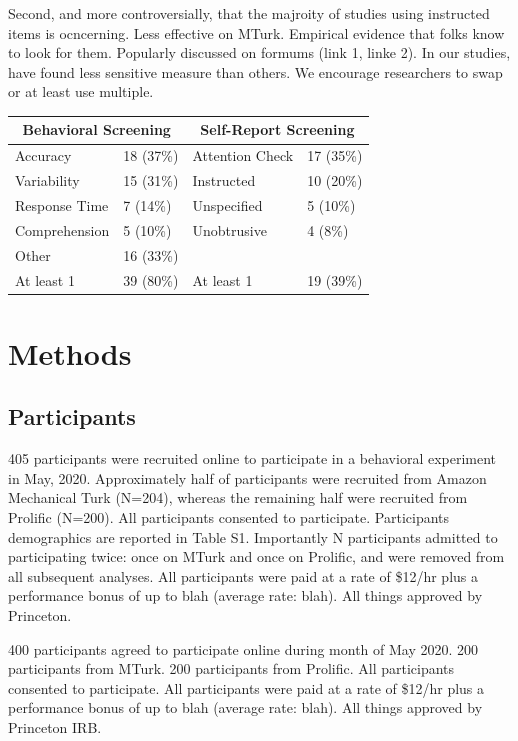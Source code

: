 \documentclass[a4paper,notitlepage,12pt]{article}
\begin{document}
Second, and more controversially, that the majroity of studies using instructed items is ocncerning. Less effective on MTurk. Empirical evidence that folks know to look for them. Popularly discussed on formums (link 1, linke 2). In our studies, have found less sensitive measure than others. We encourage researchers to swap or at least use multiple.  


\begin{tabular}{ |p{3cm}||p{3cm}|p{3cm}|p{3cm}|  }
 \hline
 \multicolumn{2}{|c|}{Behavioral Screening} &
 \multicolumn{2}{|c|}{Self-Report Screening} \\
 \hline
 Accuracy & 18 (37\%) & Attention Check & 17 (35\%) \\
 Variability & 15 (31\%) & Instructed & 10 (20\%) \\
 Response Time & 7 (14\%) & Unspecified &  5 (10\%) \\
 Comprehension & 5 (10\%) & Unobtrusive &  4 (8\%) \\
 Other & 16 (33\%) & &  \\
 \hline
 At least 1 & 39 (80\%) & At least 1 & 19 (39\%) \\
 \hline
\end{tabular}


\section{Methods}

\subsection{Participants}

405 participants were recruited online to participate in a behavioral experiment in May, 2020. Approximately half of participants were recruited from Amazon Mechanical Turk (N=204), whereas the remaining half were recruited from Prolific (N=200). All participants consented to participate. Participants demographics are reported in Table S1. Importantly N participants admitted to participating twice: once on MTurk and once on Prolific, and were removed from all subsequent analyses.  All participants were paid at a rate of \$12/hr plus a performance bonus of up to blah (average rate: blah). All things approved by Princeton. 

400 participants agreed to participate online during month of May 2020. 200 participants from MTurk. 200 participants from Prolific. All participants consented to participate. All participants were paid at a rate of \$12/hr plus a performance bonus of up to blah (average rate: blah). All things approved by Princeton IRB.  
\end{document}
